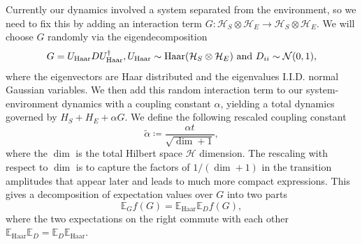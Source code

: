 \documentclass[
 amsmath,amssymb,
 aps,
onecolumn, 
nofootinbib]{revtex4-2}
\newcommand{\haar}{\text{Haar}}
\newcommand{\hilb}{\mathcal{H}}
\begin{document}
Currently our dynamics involved a system separated from the environment, so we need to fix this by adding an interaction term $G : \hilb_S \otimes \hilb_E \to \hilb_S \otimes \hilb_E$. We will choose $G$ randomly via the eigendecomposition 
\begin{equation}
    G = U_{\haar} D U_{\haar}^\dagger, U_{\haar} \sim {\rm Haar}(\hilb_S \otimes \hilb_E) \text{ and } D_{ii} \sim \mathcal{N}(0,1), \label{eq:interaction_def}
\end{equation}
where the eigenvectors are Haar distributed and the eigenvalues I.I.D. normal Gaussian variables. We then add this random interaction term to our system-environment dynamics with a coupling constant $\alpha$, yielding a total dynamics governed by $H_S + H_E + \alpha G$. We define the following rescaled coupling constant 
 \begin{equation}
    \widetilde{\alpha} \coloneqq \frac{\alpha t}{\sqrt{\dim + 1}}, \label{eq:a_tilde_def}
\end{equation}
where the $\dim$ is the total Hilbert space $\hilb$ dimension. The rescaling with respect to $\dim$ is to capture the factors of $1/(\dim + 1)$ in the transition amplitudes that appear later and leads to much more compact expressions.
This gives a decomposition of expectation values over $G$ into two parts 
\begin{equation}
    \mathbb{E}_G f(G) = \mathbb{E}_{\haar} \mathbb{E}_{D} f(G),
\end{equation}
where the two expectations on the right commute with each other $\mathbb{E}_{\haar} \mathbb{E}_{D} = \mathbb{E}_{D} \mathbb{E}_{\haar} $. 
\end{document}
